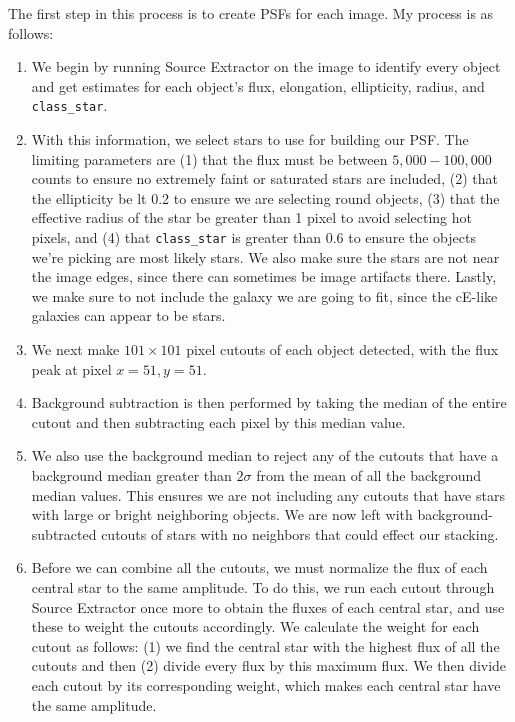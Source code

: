 \documentclass[iop,apj,twocolappendix]{emulateapj}
\begin{document}
The first step in this process is to create PSFs for each image. My process is as follows:

\begin{enumerate}

\item We begin by running Source Extractor on the image to identify every object and get estimates for each object's flux, elongation, ellipticity, radius, and \texttt{class\_star}.

\item With this information, we select stars to use for building our PSF. The limiting parameters are (1) that the flux must be between $5,000-100,000$ counts to ensure no extremely faint or saturated stars are included, (2) that the ellipticity be lt 0.2 to ensure we are selecting round objects, (3) that the effective radius of the star be greater than 1 pixel to avoid selecting hot pixels, and (4) that \texttt{class\_star} is greater than 0.6 to ensure the objects we're picking are most likely stars. We also make sure the stars are not near the image edges, since there can sometimes be image artifacts there. Lastly, we make sure to not include the galaxy we are going to fit, since the cE-like galaxies can appear to be stars.

\item We next make $101\times101$ pixel cutouts of each object detected, with the flux peak at pixel $x=51,y=51$. 

\item Background subtraction is then performed by taking the median of the entire cutout and then subtracting each pixel by this median value.

\item We also use the background median to reject any of the cutouts that have a background median greater than $2\sigma$ from the mean of all the background median values. This ensures we are not including any cutouts that have stars with large or bright neighboring objects. We are now left with background-subtracted cutouts of stars with no neighbors that could effect our stacking. 

\item Before we can combine all the cutouts, we must normalize the flux of each central star to the same amplitude. To do this, we run each cutout through Source Extractor once more to obtain the fluxes of each central star, and use these to weight the cutouts accordingly. We calculate the weight for each cutout as follows: (1) we find the central star with the highest flux of all the cutouts and then (2) divide every flux by this maximum flux. We then divide each cutout by its corresponding weight, which makes each central star have the same amplitude.


\end{enumerate}
\end{document}
